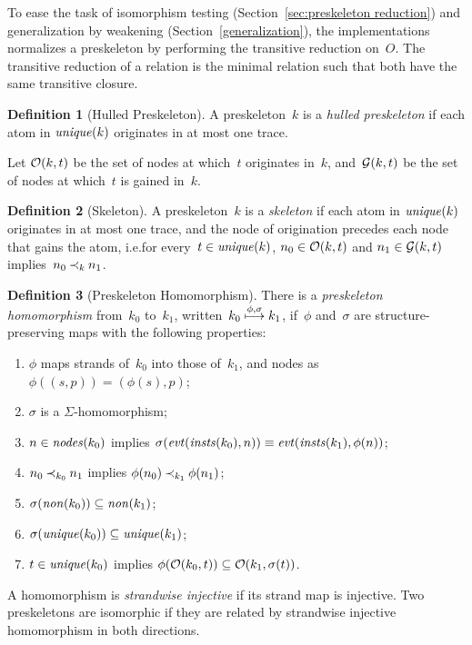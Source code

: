 \documentclass[12pt]{article}
\theoremstyle{definition}
\newtheorem{defn}{Definition}[section]
\begin{document}
To ease the task of isomorphism testing (Section~\ref{sec:preskeleton
  reduction}) and generalization by weakening
(Section~\ref{generalization}), the implementations normalizes a
preskeleton by performing the transitive reduction on~$O$.  The
transitive reduction of a relation is the minimal relation such that
both have the same transitive closure.

\begin{defn}[Hulled Preskeleton]
A preskeleton~$k$ is a \emph{hulled preskeleton} if each atom in
$\operatorname{\mathit{unique}}(k)$ originates in at most one trace.
\end{defn}

Let $\mathcal{O}(k,t)$ be the set of nodes at which~$t$ originates in~$k$,
and~$\mathcal{G}(k,t)$ be the set of nodes at which~$t$ is gained
in~$k$.

\begin{defn}[Skeleton]
A preskeleton~$k$ is a \emph{skeleton} if each atom in
$\operatorname{\mathit{unique}}(k)$ originates in at most one trace, and the node of
origination precedes each node that gains the atom, i.e.\@ for
every~$t\in\operatorname{\mathit{unique}}(k)$, $n_0\in\mathcal{O}(k,t)$ and $n_1\in\mathcal{G}(k,t)$
implies~$n_0\mathbin{\prec_{k}}n_1$.
\end{defn}

\begin{defn}[Preskeleton Homomorphism]\label{def:homomorphism}
There is a \emph{preskeleton homomorphism} from~$k_0$ to~$k_1$,
written~$k_0\stackrel{\phi,\sigma}{\longmapsto}k_1$, if~$\phi$ and~$\sigma$ are
structure-preserving maps with the following properties:
\begin{enumerate}
\item $\phi$ maps strands of~$k_0$ into those of~$k_1$, and nodes as
$\phi((s,p))=(\phi(s),p)$;
\item $\sigma$ is a $\Sigma$-homo\-morph\-ism;
\item $n\in\operatorname{\mathit{nodes}}(k_0)$ implies $\sigma(\operatorname{\mathit{evt}}(\operatorname{\mathit{insts}}(k_0),n))\equiv
  \operatorname{\mathit{evt}}(\operatorname{\mathit{insts}}(k_1),\phi(n))$;
\item $n_0\mathbin{\prec_{k_0}}n_1$ implies $\phi(n_0)\mathbin{\prec_{k_1}}\phi(n_1)$;
\item $\sigma(\operatorname{\mathit{non}}(k_0)) \subseteq \operatorname{\mathit{non}}(k_1)$;
\item $\sigma(\operatorname{\mathit{unique}}(k_0)) \subseteq \operatorname{\mathit{unique}}(k_1)$;
\item\label{enu:orig} $t\in \operatorname{\mathit{unique}}(k_0)$ implies
  $\phi(\mathcal{O}(k_0,t))\subseteq\mathcal{O}(k_1,\sigma(t))$.
\end{enumerate}
A homomorphism is \emph{strandwise
  injective} if its strand map is injective.  Two preskeletons are
isomorphic if they are related by strandwise injective homomorphism in
both directions.
\end{defn}
\end{document}
